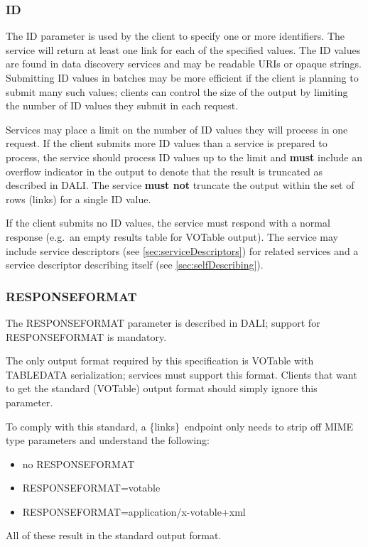 \documentclass[11pt,a4paper]{ivoa}
\newcommand{\blinks}{\{links\}}
\begin{document}
\subsubsection{ID}
\label{sec:resourceId}

The ID parameter is used by the client to specify one or more
identifiers. The service will return at least one link for each of the
specified values. The ID values are found in data discovery services
and may be readable URIs or opaque strings. Submitting ID values in batches
may be more efficient if the client is planning to submit many such values;
clients can control the size of the output by limiting the number of ID values 
they submit in each request.

Services may place a limit on the number of ID values they will process in one 
request. If the client submits more ID values than a service is prepared to
process, the service should process ID values up to the limit and
{\bf must} include an overflow indicator in the output to denote that
the result is truncated as described in DALI.
The service {\bf must not} truncate the output within the set of rows
(links) for a single ID value.

If the client submits no ID values, the service must respond with a
normal response (e.g.\ an empty results table for VOTable output).
The service may include service descriptors
(see \ref{sec:serviceDescriptors})
for related services and a service descriptor describing itself
(see \ref{sec:selfDescribing}).


\subsubsection{RESPONSEFORMAT}
\label{sec:responseformat}

The RESPONSEFORMAT parameter is described in DALI;
support for RESPONSEFORMAT is mandatory.

The only output format required by this specification is VOTable with
TABLEDATA serialization; services must support this format. Clients
that want to get the standard (VOTable) output format should simply
ignore this parameter.

To comply with this standard, a \blinks\ endpoint only needs to strip
off MIME type parameters and understand the following:
\begin{itemize}
  \item no RESPONSEFORMAT
  \item RESPONSEFORMAT=votable
  \item RESPONSEFORMAT=application/x-votable+xml
\end{itemize}
All of these result in the standard output format.
\end{document}
